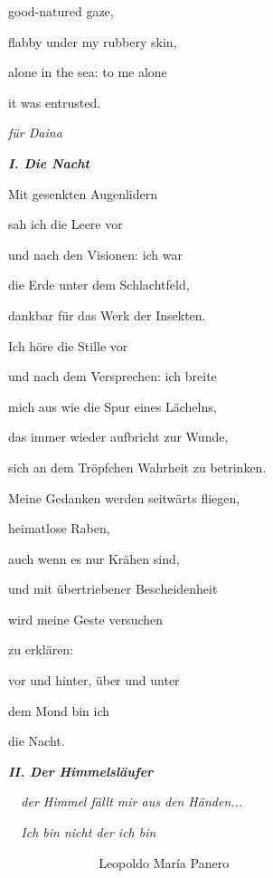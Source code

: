 good-natured gaze,

flabby under my rubbery skin,

alone in the sea: to me alone

it was entrusted.


\bigskip


\bigskip


\emph{
für Daina }


\bigskip

{\bfseries\itshape
I. Die Nacht}


\bigskip

Mit gesenkten Augenlidern 

sah ich die Leere vor

und nach den Visionen: ich war

die Erde unter dem Schlachtfeld,

dankbar für das Werk der Insekten.


\bigskip

Ich höre die Stille vor

und nach dem Versprechen: ich breite

mich aus wie die Spur eines Lächelns,

das immer wieder aufbricht zur Wunde,

sich an dem Tröpfchen Wahrheit zu betrinken.


\bigskip

Meine Gedanken werden seitwärts fliegen, 

heimatlose Raben,

auch wenn es nur Krähen sind,

und mit übertriebener Bescheidenheit

wird meine Geste versuchen

zu erklären:

vor und hinter, über und unter

dem Mond bin ich

die Nacht.


\bigskip

{\bfseries\itshape
II. Der Himmelsläufer}


\bigskip

\emph{
\ \ der Himmel fällt mir aus den Händen...}

\emph{
\ \ Ich bin nicht der ich bin}

\emph{\ \  \ \ \ \ \ \ \ \ \ \ \ \ }Leopoldo María Panero


\bigskip

